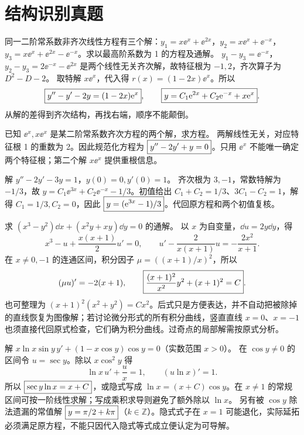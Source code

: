 \section{结构识别真题}
同一二阶常系数非齐次线性方程有三个解：$y_1=x\ee^x+\ee^{2x}$，$y_2=x\ee^x+\ee^{-x}$，$y_3=x\ee^x+\ee^{2x}-\ee^{-x}$。求以最高阶系数为 1 的方程及通解。
\sol $y_1-y_3=\ee^{-x}$，$y_2-y_3=2\ee^{-x}-\ee^{2x}$ 是两个线性无关齐次解，故特征根为 $-1,2$，齐次算子为 $D^2-D-2$。
取特解 $x\ee^x$，代入得 $r(x)=(1-2x)\ee^x$。所以
\[
\boxed{y''-y'-2y=(1-2x)\mathrm e^x},\qquad
\boxed{y=C_1\mathrm e^{2x}+C_2\mathrm e^{-x}+x\mathrm e^x}.
\]
从解的差得到齐次结构，再找右端，顺序不能颠倒。

已知 $\ee^x,x\ee^x$ 是某二阶常系数齐次方程的两个解，求方程。
\sol 两解线性无关，对应特征根 1 的重数为 2。因此规范化方程为 $\boxed{y''-2y'+y=0}$。只用 $\ee^x$ 不能唯一确定两个特征根；第二个解 $x\ee^x$ 提供重根信息。

解 $y''-2y'-3y=1$，$y(0)=0,y'(0)=1$。
\sol 齐次根为 $3,-1$，常数特解为 $-1/3$，故 $y=C_1\ee^{3x}+C_2\ee^{-x}-1/3$。初值给出 $C_1+C_2=1/3$、$3C_1-C_2=1$，解得 $C_1=1/3,C_2=0$，因此 $\boxed{y=(\mathrm e^{3x}-1)/3}$。代回原方程和两个初值复核。

求 $(x^3-y^2)\dd x+(x^2y+xy)\dd y=0$ 的通解。
\sol 以 $x$ 为自变量，$\dd u=2y\dd y$，得
\[x^3-u+\frac{x(x+1)}2u'=0,\qquad
u'-\frac2{x(x+1)}u=-\frac{2x^2}{x+1}.\]
在 $x\ne0,-1$ 的连通区间，积分因子 $\mu=((x+1)/x)^2$，所以
\[(\mu u)'=-2(x+1),\qquad
\boxed{\frac{(x+1)^2}{x^2}y^2+(x+1)^2=C}.\]
也可整理为 $(x+1)^2(x^2+y^2)=Cx^2$。后式只是方便表达，并不自动把被除掉的直线恢复为图像解；若讨论微分形式的所有积分曲线，竖直直线 $x=0$、$x=-1$ 也须直接代回原式检查，它们确为积分曲线。过奇点的局部解需按原式分析。

解 $x\ln x\sin y\,y'+(1-x\cos y)\cos y=0$（实数范围 $x>0$）。
\sol 在 $\cos y\ne0$ 的区间令 $u=\sec y$。除以 $x\cos^2y$ 得
\[\ln x\,u'+\frac ux=1,\qquad (u\ln x)'=1.\]
所以 $\boxed{\sec y\ln x=x+C}$，或隐式写成 $\ln x=(x+C)\cos y$。在 $x\ne1$ 的常规区间可按一阶线性求解；写成乘积求导则避免了额外除以 $\ln x$。
另有被 $\cos y$ 除法遗漏的常值解 $\boxed{y=\pi/2+k\pi}$（$k\in\mathbb Z$）。隐式式子在 $x=1$ 可能退化，实际延拓必须满足原方程，不能只因代入隐式等式成立便认定为可导解。
